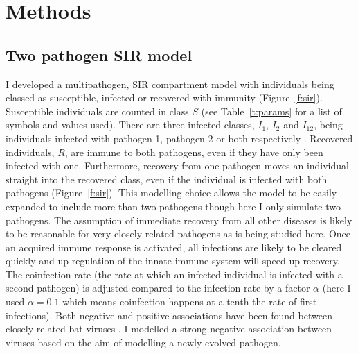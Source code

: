 
\section{Methods}








\subsection{Two pathogen SIR model}

I developed a multipathogen, SIR compartment model with individuals being classed as susceptible, infected or recovered with immunity (Figure~\ref{f:sir}).
Susceptible individuals are counted in class $S$ (see Table~\ref{t:params} for a list of symbols and values used).
There are three infected classes, $I_1$, $I_2$ and $I_{12}$, being individuals infected with pathogen 1, pathogen 2 or both respectively .
Recovered individuals, $R$, are immune to both pathogens, even if they have only been infected with one.
Furthermore, recovery from one pathogen moves an individual straight into the recovered class, even if the individual is infected with both pathogens (Figure~\ref{f:sir}).
This modelling choice allows the model to be easily expanded to include more than two pathogens though here I only simulate two pathogens.
The assumption of immediate recovery from all other diseases is likely to be reasonable for very closely related pathogens as is being studied here.
Once an acquired immune response is activated, all infections are likely to be cleared quickly and up-regulation of the innate immune system will speed up recovery. 
The coinfection rate (the rate at which an infected individual is infected with a second pathogen) is adjusted compared to the infection rate by a factor $\alpha$ (here I used $\alpha = 0.1$ which means coinfection happens at a tenth the rate of first infections).
Both negative and positive associations have been found between closely related bat viruses \cite{anthony2013strategy}.
I modelled a strong negative association between viruses based on the aim of modelling a newly evolved pathogen.


